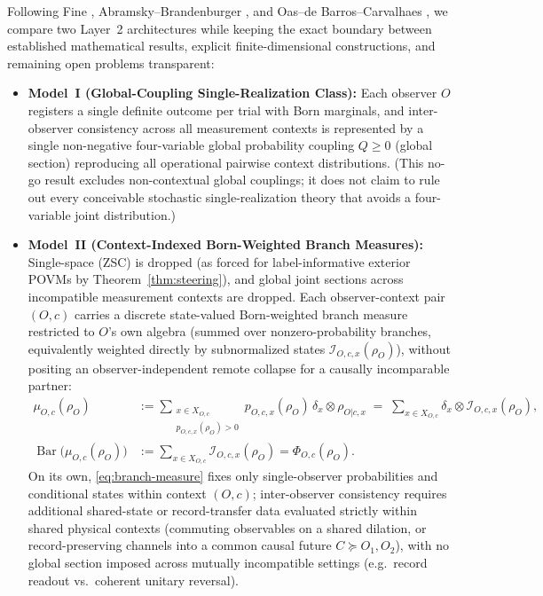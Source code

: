 \documentclass[11pt,a4paper]{article}
\theoremstyle{definition}
\theoremstyle{remark}
\newcommand{\BarMap}{\operatorname{Bar}}
\newcommand{\cI}{\mathcal{I}}
\newcommand{\1}{\mathbf{1}}
\begin{document}
Following Fine \cite{Fine1982}, Abramsky--Brandenburger \cite{AbramskyBrandenburger2011}, and Oas--de Barros--Carvalhaes \cite{Oas2014}, we compare two Layer~2 architectures while keeping the exact boundary between established mathematical results, explicit finite-dimensional constructions, and remaining open problems transparent:
\begin{itemize}
  \item \textbf{Model~I (Global-Coupling Single-Realization Class):} Each observer $O$ registers a single definite outcome per trial with Born marginals, and inter-observer consistency across all measurement contexts is represented by a single non-negative four-variable global probability coupling $Q\ge 0$ (global section) reproducing all operational pairwise context distributions. (This no-go result excludes non-contextual global couplings; it does not claim to rule out every conceivable stochastic single-realization theory that avoids a four-variable joint distribution.)
  \item \textbf{Model~II (Context-Indexed Born-Weighted Branch Measures):} Single-space (ZSC) is dropped (as forced for label-informative exterior POVMs by Theorem~\ref{thm:steering}), and global joint sections across incompatible measurement contexts are dropped. Each observer-context pair $(O,c)$ carries a discrete state-valued Born-weighted branch measure restricted to $O$'s own algebra (summed over nonzero-probability branches, equivalently weighted directly by subnormalized states $\cI_{O,c,x}(\rho_O)$), without positing an observer-independent remote collapse for a causally incomparable partner:
  \begin{equation}\label{eq:branch-measure}
    \begin{aligned}
      \mu_{O,c}(\rho_O) &:= \sum_{\substack{x\in X_{O,c}\\ p_{O,c,x}(\rho_O)>0}} p_{O,c,x}(\rho_O)\,\delta_x \otimes \rho_{O|c,x}
      \;=\; \sum_{x\in X_{O,c}} \delta_x \otimes \cI_{O,c,x}(\rho_O),\\
      \BarMap\bigl(\mu_{O,c}(\rho_O)\bigr) &:= \sum_{x\in X_{O,c}} \cI_{O,c,x}(\rho_O) = \Phi_{O,c}(\rho_O).
    \end{aligned}
  \end{equation}
  On its own, \eqref{eq:branch-measure} fixes only single-observer probabilities and conditional states within context $(O,c)$; inter-observer consistency requires additional shared-state or record-transfer data evaluated strictly within shared physical contexts (commuting observables on a shared dilation, or record-preserving channels into a common causal future $C\succeq O_1,O_2$), with no global section imposed across mutually incompatible settings (e.g.\ record readout vs.\ coherent unitary reversal).
\end{itemize}
\end{document}
